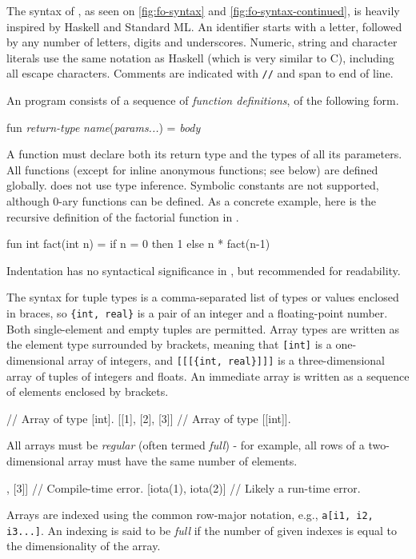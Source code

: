 The syntax of \LO{}, as seen on \cref{fig:fo-syntax} and
\cref{fig:fo-syntax-continued}, is heavily inspired by Haskell and
Standard ML.  An identifier starts with a letter, followed by any
number of letters, digits and underscores.  Numeric, string and
character literals use the same notation as Haskell (which is very
similar to C), including all escape characters.  Comments are
indicated with \texttt{//} and span to end of line.

An \LO{} program consists of a sequence of \emph{function
  definitions}, of the following form.

\begin{colorcode}
  fun \textit{return-type} \textit{name}(\textit{params...}) = \textit{body}
\end{colorcode}

A function must declare both its return type and the types of all its
parameters.  All functions (except for inline anonymous functions; see
below) are defined globally.  \LO{} does not use type inference.
Symbolic constants are not supported, although 0-ary functions can be
defined.  As a concrete example, here is the recursive definition of
the factorial function in \LO{}.
\begin{colorcode}
  fun int fact(int n) =
    if n = 0 then 1
             else n * fact(n-1)
\end{colorcode}
Indentation has no syntactical significance in \LO{}, but recommended for
readability.

The syntax for tuple types is a comma-separated list of types or
values enclosed in braces, so \texttt{\{int, real\}} is a pair of an
integer and a floating-point number.  Both single-element and empty
tuples are permitted.  Array types are written as the element type
surrounded by brackets, meaning that \texttt{[int]} is a
one-dimensional array of integers, and \texttt{[[[\{int, real\}]]]} is a
three-dimensional array of tuples of integers and floats.  An
immediate array is written as a sequence of elements enclosed by
brackets.
\begin{colorcode}
  [1, 2, 3]       // Array of type [int].
  [[1], [2], [3]] // Array of type [[int]].
\end{colorcode}
All arrays must be \emph{regular} (often termed \emph{full}) - for
example, all rows of a two-dimensional array must have the same number
of elements.
\begin{colorcode}
  [[1, 2], [3]]      // Compile-time error.
  [iota(1), iota(2)] // Likely a run-time error.
\end{colorcode}
Arrays are indexed using the common row-major notation, e.g.,
\texttt{a[i1, i2, i3...]}.  An indexing is said to be \textit{full} if
the number of given indexes is equal to the dimensionality of the
array.

